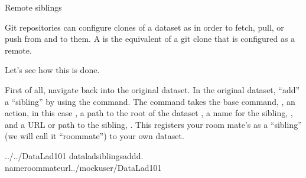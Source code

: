 \ignorespaces \begin{gitusernote}[label={index-1}, before title={\thetcbcounter\ }, float, floatplacement=tbp, check odd page=true]{Remote siblings}
\label{\detokenize{basics/101-121-siblings:index-1}}

\sphinxAtStartPar
Git repositories can configure clones of a dataset as  in
order to fetch, pull, or push from and to them. A 
is the equivalent of a git clone that is configured as a remote.


\end{gitusernote}

\sphinxAtStartPar
Let’s see how this is done.

\ignorespaces 
\sphinxAtStartPar
First of all, navigate back into the original dataset.
In the original dataset, “add” a “sibling” by using
the  command.
The command takes the base command,
, an action, in this case , a path to the
root of the dataset , a name for the sibling, ,
and a URL or path to the sibling, .
This registers your room mate’s  as a “sibling” (we will call it
“roommate”) to your own  dataset.

\begin{sphinxVerbatim}[commandchars=\\\{\}]
../../DataLad\PYGZhy{}101
dataladsiblingsadd\PYGZhy{}d.
\PYGZhy{}\PYGZhy{}nameroommate\PYGZhy{}\PYGZhy{}url../mock\PYGZus{}user/DataLad\PYGZhy{}101
\end{sphinxVerbatim}

